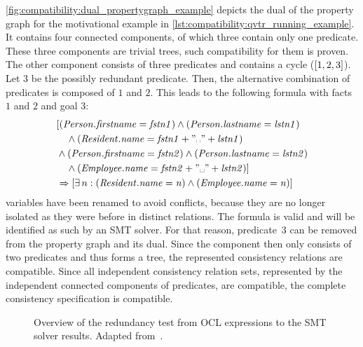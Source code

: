 \begin{example}
\autoref{fig:compatibility:dual_propertygraph_example} depicts the dual of the property graph for the motivational example in \autoref{lst:compatibility:qvtr_running_example}. 
It contains four connected components, of which three contain only one predicate. 
These three components are trivial trees, such compatibility for them is proven.
The other component consists of three predicates and contains a cycle ($[1, 2, 3]$).
Let $3$ be the possibly redundant predicate.
Then, the alternative combination of predicates is composed of $1$ and $2$. 
This leads to the following formula with facts $1$ and $2$ and goal $3$:
\begin{align*}
    &
        [(\propdisplay{Person.firstname} = \mathvariable{fstn1}) \land (\propdisplay{Person.lastname} = \mathvariable{lstn1})\\
    &
        \formulaskip \land (\propdisplay{Resident.name} = \mathvariable{fstn1} + "\text{\textvisiblespace}" + \mathvariable{lstn1}) \\%
    & 
        \land %
            (\propdisplay{Person.firstname} = \mathvariable{fstn2}) \land (\propdisplay{Person.lastname} = \mathvariable{lstn2})\\
    &
        \formulaskip \land (\propdisplay{Employee.name} = \mathvariable{fstn2} + "\text{\textvisiblespace}" + \mathvariable{lstn2})]\\
    & 
        \Rightarrow
        [\exists n : (\propdisplay{Resident.name} = \mathvariable{n}) \land (\propdisplay{Employee.name} = \mathvariable{n})]
\end{align*}
\qvtr variables have been renamed to avoid conflicts, because they are no longer isolated as they were before in distinct \qvtr relations.
The formula is valid and will be identified as such by an \gls{SMT} solver.
For that reason, predicate~$3$ can be removed from the property graph and its dual. 
Since the component then only consists of two predicates and thus forms a tree, the represented consistency relations are compatible.
Since all independent consistency relation sets, represented by the independent connected components of predicates, are compatible, the complete consistency specification is compatible.
\end{example}

\begin{figure}
    \centering
    
    \caption[Redundancy test overview]{Overview of the redundancy test from \gls{OCL} expressions to the \gls{SMT} solver results. Adapted from~.}
    \label{fig:compatibility:redundancytest}
\end{figure}

